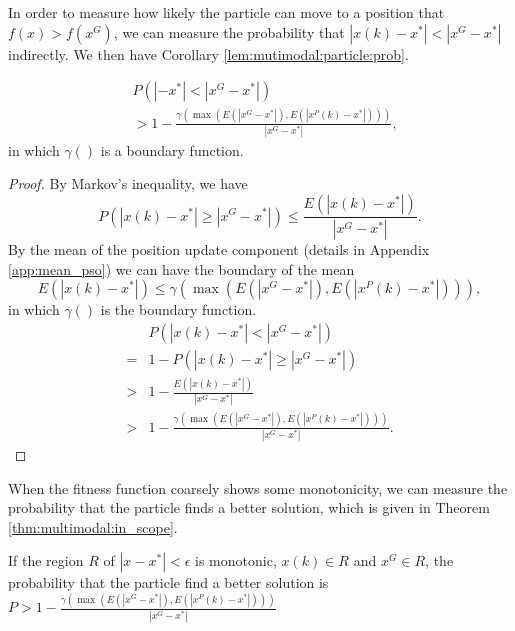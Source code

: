 In order to measure how likely the particle can move to a position that $ f(x) > f(x^{G}) $, we can measure the probability that $ | x(k) - x^{*} | < | x^{G} - x^{*} | $ indirectly.
We then have Corollary \ref{lem:mutimodal:particle:prob}.
\begin{mycoro}
\label{lem:mutimodal:particle:prob}
\begin{equation}
\begin{aligned}
& P( | - x^{*} | < | x^{G} - x^{*} | ) \\
& > 1 - \frac{ \gamma ( \max ( E( | x^{G} - x^{*} | ), E( | x^{P}(k) - x^{*}  | ) ) ) }{ | x^{G} - x^{*} | },
\end{aligned}
\end{equation}
in which $ \gamma () $ is a boundary function.
\begin{proof}
By Markov's inequality, we have
\begin{equation}
P( | x(k) - x^{*} | \geq | x^{G} - x^{*} | ) \leq \frac{ E( | x(k) - x^{*} | ) }{ | x^{G} - x^{*} | }.
\end{equation} 
By the mean of the position update component (details in Appendix \ref{app:mean_pso})
we can have the boundary of the mean
\begin{equation}
\label{eq:mean:opt_bound}
E( | x(k) - x^{*} | ) \leq \gamma ( \max ( E( | x^{G} - x^{*} | ), E( | x^{P}(k) - x^{*} | ) ) ),
\end{equation}
in which $ \gamma () $ is the boundary function.
\begin{equation}
\begin{aligned}
& P( | x(k) - x^{*} | < | x^{G} - x^{*} | ) \\
= & 1 - P( | x(k) - x^{*} | \geq | x^{G} - x^{*} | ) \\
> & 1 - \frac{ E( | x(k) - x^{*} | ) }{ | x^{G} - x^{*} | } \\
> & 1 - \frac{ \gamma ( \max ( E( | x^{G} - x^{*} | ) , E( | x^{P}(k) - x^{*}  | ) ) ) }{ | x^{G} - x^{*} | }.
\end{aligned}
\end{equation}
\end{proof}
\end{mycoro}

When the fitness function coarsely shows some monotonicity, we can measure the probability that the particle finds a better solution, which is given in Theorem \ref{thm:multimodal:in_scope}.

\begin{mythm}
\label{thm:multimodal:in_scope}
If the region $ R $ of $ | x - x^{*} | < \epsilon $ is monotonic, $ x(k) \in R $ and $ x^{G} \in R $, the probability that the particle find a better solution is $ P > 1 - \frac{ \gamma ( \max ( E( | x^{G} - x^{*} | ), E( | x^{P}(k) - x^{*}  | ) ) ) }{ | x^{G} - x^{*} | } $
\end{mythm} 

